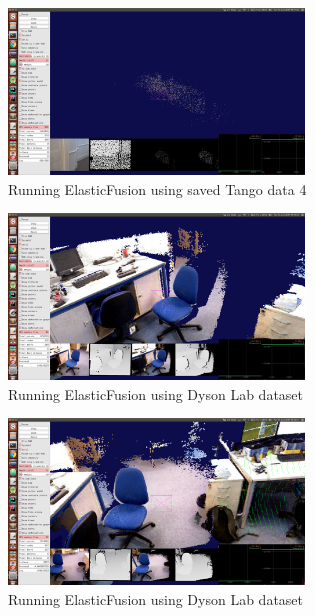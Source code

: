 \documentclass[12pt,twoside]{article}
\begin{document}
\begin{figure}[h]
    \centering
    \includegraphics[width=0.7\textwidth]{figures/Screenshot10}
    \caption{Running ElasticFusion using saved Tango data 4}
    \label{fig:Screenshot10}
\end{figure}

\begin{figure}[h]
    \centering
    \includegraphics[width=0.7\textwidth]{figures/Screenshot11}
    \caption{Running ElasticFusion using Dyson Lab dataset}
    \label{fig:Screenshot11}
\end{figure}


\begin{figure}[h]
    \centering
    \includegraphics[width=0.7\textwidth]{figures/Screenshot14}
    \caption{Running ElasticFusion using Dyson Lab dataset}
    \label{fig:Screenshot14}
\end{figure}



\newpage
\end{document}
